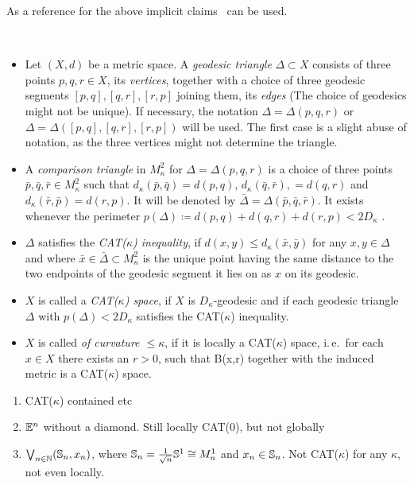 \begin{rem}
  As a reference for the above implicit claims~\cite[Sec.\ I.2, I.6]{MR1744486} can be used.
\end{rem}

\begin{defin}\label{def:cat}\
  \begin{itemize}
  \item Let \((X,d)\) be a metric space. A \emph{geodesic triangle} \(\Delta \subset X\) consists of three points \(p,q,r \in X\), its \emph{vertices}, together with a choice of three geodesic segments \([p,q], [q,r], [r, p]\) joining them, its \emph{edges} (The choice of geodesics might not be unique). If necessary, the notation \(\Delta = \Delta(p,q,r)\) or \(\Delta = \Delta([p,q], [q,r], [r,p])\) will be used. The first case is a slight abuse of notation, as the three vertices might not determine the triangle.
  \item A \emph{comparison triangle} in \(M_\kappa^2\) for \(\Delta = \Delta(p,q,r)\) is a choice of three points \(\bar p, \bar q, \bar r \in M_\kappa^2\) such that \(d_\kappa(\bar p, \bar q) = d(p, q)\), \(d_\kappa(\bar q, \bar r), = d(q, r)\) and \(d_\kappa(\bar r, \bar p) = d(r, p)\). It will be denoted by \(\bar \Delta = \Delta(\bar p, \bar q, \bar r)\). It exists whenever the perimeter \(p(\Delta) \coloneqq d(p,q) + d(q,r) + d(r,p) < 2D_\kappa\) \cite[cf.][Sec.\ I.2]{MR1744486}.
  \item \(\Delta\) satisfies the \emph{CAT(\(\kappa\)) inequality}, if \(d(x,y) \leq d_\kappa(\bar x, \bar y)\) for any \(x, y \in \Delta\) and where \(\bar x \in \bar \Delta \subset M_\kappa^2\) is the unique point having the same distance to the two endpoints of the geodesic segment it lies on as \(x\) on its geodesic.
  \item \(X\) is called a \emph{CAT(\(\kappa\)) space}, if \(X\) is \(D_\kappa\)-geodesic and if each geodesic triangle \(\Delta\) with \(p(\Delta) < 2 D_\kappa\) satisfies the CAT(\(\kappa\)) inequality.
  \item \(X\) is called \emph{of curvature \(\leq \kappa\)}, if it is locally a CAT(\(\kappa\)) space, i.\,e.\ for each \(x \in X\) there exists an \(r > 0\), such that B(x,r) together with the induced metric is a CAT(\(\kappa\)) space.
  \end{itemize}
\end{defin}

\begin{bsp}
  \begin{enumerate}
  \item CAT(\(\kappa\)) contained etc
  \item \(\mathbb{E}^n\) without a diamond. Still locally CAT(0), but not globally
  \item \(\bigvee_{n \in \mathbb{N}} (\mathbb{S}_n, x_n)\), where \(\mathbb{S}_n = \frac{1}{\sqrt{n}} \mathbb{S}^1 \cong M_n^1\) and \(x_n \in \mathbb{S}_n\). Not CAT(\(\kappa\)) for any \(\kappa\), not even locally.
  \end{enumerate}
\end{bsp}

